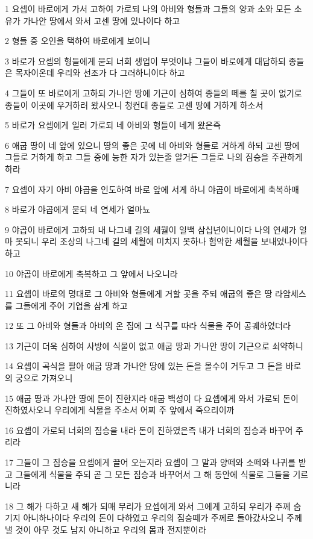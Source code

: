 \par 1 요셉이 바로에게 가서 고하여 가로되 나의 아비와 형들과 그들의 양과 소와 모든 소유가 가나안 땅에서 와서 고센 땅에 있나이다 하고
\par 2 형들 중 오인을 택하여 바로에게 보이니
\par 3 바로가 요셉의 형들에게 묻되 너희 생업이 무엇이냐 그들이 바로에게 대답하되 종들은 목자이온데 우리와 선조가 다 그러하니이다 하고
\par 4 그들이 또 바로에게 고하되 가나안 땅에 기근이 심하여 종들의 떼를 칠 곳이 없기로 종들이 이곳에 우거하러 왔사오니 청컨대 종들로 고센 땅에 거하게 하소서
\par 5 바로가 요셉에게 일러 가로되 네 아비와 형들이 네게 왔은즉
\par 6 애굽 땅이 네 앞에 있으니 땅의 좋은 곳에 네 아비와 형들로 거하게 하되 고센 땅에 그들로 거하게 하고 그들 중에 능한 자가 있는줄 알거든 그들로 나의 짐승을 주관하게 하라
\par 7 요셉이 자기 아비 야곱을 인도하여 바로 앞에 서게 하니 야곱이 바로에게 축복하매
\par 8 바로가 야곱에게 묻되 네 연세가 얼마뇨
\par 9 야곱이 바로에게 고하되 내 나그네 길의 세월이 일백 삼십년이니이다 나의 연세가 얼마 못되니 우리 조상의 나그네 길의 세월에 미치지 못하나 험악한 세월을 보내었나이다 하고
\par 10 야곱이 바로에게 축복하고 그 앞에서 나오니라
\par 11 요셉이 바로의 명대로 그 아비와 형들에게 거할 곳을 주되 애굽의 좋은 땅 라암세스를 그들에게 주어 기업을 삼게 하고
\par 12 또 그 아비와 형들과 아비의 온 집에 그 식구를 따라 식물을 주어 공궤하였더라
\par 13 기근이 더욱 심하여 사방에 식물이 없고 애굽 땅과 가나안 땅이 기근으로 쇠약하니
\par 14 요셉이 곡식을 팔아 애굽 땅과 가나안 땅에 있는 돈을 몰수이 거두고 그 돈을 바로의 궁으로 가져오니
\par 15 애굽 땅과 가나안 땅에 돈이 진한지라 애굽 백성이 다 요셉에게 와서 가로되 돈이 진하였사오니 우리에게 식물을 주소서 어찌 주 앞에서 죽으리이까
\par 16 요셉이 가로되 너희의 짐승을 내라 돈이 진하였은즉 내가 너희의 짐승과 바꾸어 주리라
\par 17 그들이 그 짐승을 요셉에게 끌어 오는지라 요셉이 그 말과 양떼와 소떼와 나귀를 받고 그들에게 식물을 주되 곧 그 모든 짐승과 바꾸어서 그 해 동안에 식물로 그들을 기르니라
\par 18 그 해가 다하고 새 해가 되매 무리가 요셉에게 와서 그에게 고하되 우리가 주께 숨기지 아니하나이다 우리의 돈이 다하였고 우리의 짐승떼가 주께로 돌아갔사오니 주께 낼 것이 아무 것도 남지 아니하고 우리의 몸과 전지뿐이라
